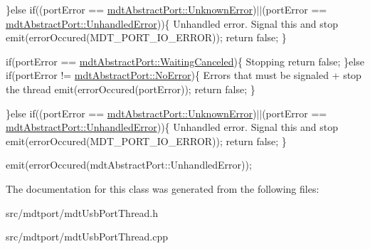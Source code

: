 \}else if((portError == \hyperlink{classmdt_abstract_port_ad4121bb930c95887e77f8bafa065a85eacb8cc31d0b00dda9e25ed1cc1fa17871}{mdtAbstractPort::UnknownError})$|$$|$(portError == \hyperlink{classmdt_abstract_port_ad4121bb930c95887e77f8bafa065a85ea6e24e272af4da51c84eef5825c5cd712}{mdtAbstractPort::UnhandledError}))\{ Unhandled error. Signal this and stop emit(errorOccured(MDT\_\-PORT\_\-IO\_\-ERROR)); return false; \}

if(portError == \hyperlink{classmdt_abstract_port_ad4121bb930c95887e77f8bafa065a85ea14c0ddb478968710cb057a70406e4888}{mdtAbstractPort::WaitingCanceled})\{ Stopping return false; \}else if(portError != \hyperlink{classmdt_abstract_port_ad4121bb930c95887e77f8bafa065a85eab898bd273effe5cb4ed1a399a2d4baad}{mdtAbstractPort::NoError})\{ Errors that must be signaled + stop the thread emit(errorOccured(portError)); return false; \}

\}else if((portError == \hyperlink{classmdt_abstract_port_ad4121bb930c95887e77f8bafa065a85eacb8cc31d0b00dda9e25ed1cc1fa17871}{mdtAbstractPort::UnknownError})$|$$|$(portError == \hyperlink{classmdt_abstract_port_ad4121bb930c95887e77f8bafa065a85ea6e24e272af4da51c84eef5825c5cd712}{mdtAbstractPort::UnhandledError}))\{ Unhandled error. Signal this and stop emit(errorOccured(MDT\_\-PORT\_\-IO\_\-ERROR)); return false; \}

emit(errorOccured(mdtAbstractPort::UnhandledError)); 



The documentation for this class was generated from the following files:\begin{DoxyCompactItemize}
\item 
src/mdtport/mdtUsbPortThread.h\item 
src/mdtport/mdtUsbPortThread.cpp\end{DoxyCompactItemize}
